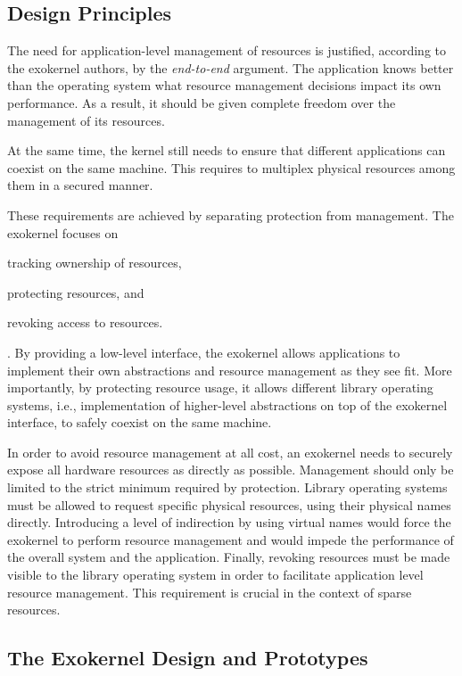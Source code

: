 \subsection{Design Principles}
The need for application-level management of resources is justified, according to the exokernel authors, by the \emph{end-to-end} argument.
The application knows better than the operating system what resource management decisions impact its own performance.
As a result, it should be given complete freedom over the management of its resources.

At the same time, the kernel still needs to ensure that different applications can coexist on the same machine.
This requires to multiplex physical resources among them in a secured manner.

These requirements are achieved by separating protection from management.
The exokernel focuses on
\begin{enumerate*}
	\item tracking ownership of resources,
	\item protecting resources, and
	\item revoking access to resources.
\end{enumerate*}.
By providing a low-level interface, the exokernel allows applications to implement their own abstractions and resource management as they see fit.
More importantly, by protecting resource usage, it allows different library operating systems, i.e., implementation of higher-level abstractions on top of the exokernel interface, to safely coexist on the same machine.

In order to avoid resource management at all cost, an exokernel needs to securely expose all hardware resources as directly as possible.
Management should only be limited to the strict minimum required by protection.
Library operating systems must be allowed to request specific physical resources, using their physical names directly.
Introducing a level of indirection by using virtual names would force the exokernel to perform resource management and would impede the performance of the overall system and the application.
Finally, revoking resources must be made visible to the library operating system in order to facilitate application level resource management.
This requirement is crucial in the context of sparse resources.

\subsection{The Exokernel Design and Prototypes}


